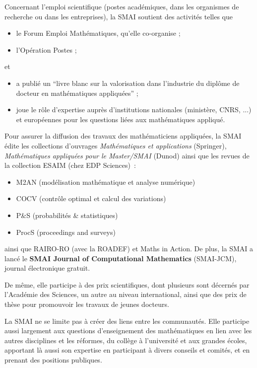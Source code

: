 Concernant l'emploi scientifique (postes acad\'emiques, dans les organismes de recherche ou dans les entreprises), la SMAI soutient des activit\'es
telles que
\begin{itemize}%
    \item le Forum Emploi Math\'ematiques, qu'elle co-organise ;
    \item l'Op\'eration Postes ;
\end{itemize}
et
\begin{itemize}%
    \item a publi\'e un ``livre blanc sur la valorisation dans l'industrie du dipl\^ome de docteur en math\'ematiques appliqu\'ees'' ;
    \item joue le r\^ole d'expertise aupr\`es d'institutions
	nationales (minist\`ere, CNRS, ...) et europ\'eennes
	pour les questions li\'ees aux math\'ematiques appliqu\'e.
\end{itemize}

Pour assurer la diffusion des travaux des math\'ematiciens
appliqu\'ees, la SMAI \'edite les collections d'ouvrages
\emph{Math\'ematiques et applications} (Springer), \emph{Math\'ematiques appliqu\'ees
pour le Master/SMAI} (Dunod) ainsi que les revues de la collection
ESAIM (chez EDP Sciences)~: 
	\begin{itemize}
		\item M2AN (mod\'elisation math\'ematique et analyse num\'erique)
		\item COCV (contr\^ole optimal et calcul des variations)
		\item P\&S (probabilit\'es \& statistiques)
		\item ProcS (proceedings and surveys)
	\end{itemize}
ainsi que RAIRO-RO (avec la ROADEF) et Maths in Action. De plus, la SMAI a lanc\'e le \textbf{SMAI Journal of Computational Mathematics}
(SMAI-JCM), journal \'electronique gratuit.

De m\^eme, elle participe \`a des prix scientifiques,
dont plusieurs sont d\'ecern\'es par l'Acad\'emie des Sciences,
un autre au niveau international, ainsi que des prix
de th\`ese pour promouvoir les travaux de jeunes docteurs.

La SMAI ne se limite pas \`a cr\'eer
des liens entre les communaut\'es. Elle participe aussi largement aux questions
d'enseignement des math\'ematiques en lien avec les autres disciplines et les r\'eformes, du coll\`ege \`a l'universit\'e
et aux grandes \'ecoles,
apportant l\`a aussi son expertise en
participant \`a divers conseils et comit\'es, et en prenant
des positions publiques.

